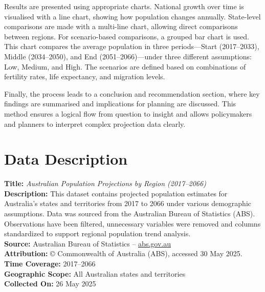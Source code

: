 \documentclass[
  11pt,
]{article}
\begin{document}
Results are presented using appropriate charts. National growth over
time is visualised with a line chart, showing how population changes
annually. State-level comparisons are made with a multi-line chart,
allowing direct comparisons between regions. For scenario-based
comparisons, a grouped bar chart is used. This chart compares the
average population in three periods---Start (2017--2033), Middle
(2034--2050), and End (2051--2066)---under three different assumptions:
Low, Medium, and High. The scenarios are defined based on combinations
of fertility rates, life expectancy, and migration levels.

Finally, the process leads to a conclusion and recommendation section,
where key findings are summarised and implications for planning are
discussed. This method ensures a logical flow from question to insight
and allows policymakers and planners to interpret complex projection
data clearly.

\section{Data Description}\label{data-description}

\begin{tcolorbox}[enhanced jigsaw, rightrule=.15mm, colbacktitle=quarto-callout-note-color!10!white, coltitle=black, opacitybacktitle=0.6, titlerule=0mm, bottomrule=.15mm, arc=.35mm, colback=white, left=2mm, toprule=.15mm, toptitle=1mm, opacityback=0, bottomtitle=1mm, colframe=quarto-callout-note-color-frame, title=\textcolor{quarto-callout-note-color}{\faInfo}\hspace{0.5em}{Meta Data}, leftrule=.75mm, breakable]

\textbf{Title:} \emph{Australian Population Projections by Region
(2017--2066)}\\
\textbf{Description:} This dataset contains projected population
estimates for Australia's states and territories from 2017 to 2066 under
various demographic assumptions. Data was sourced from the Australian
Bureau of Statistics (ABS). Observations have been filtered, unnecessary
variables were removed and columns standardized to support regional
population trend analysis.\\
\textbf{Source:} Australian Bureau of Statistics --
\href{https://www.abs.gov.au}{abs.gov.au}\\
\textbf{Attribution:} © Commonwealth of Australia (ABS), accessed 30 May
2025.\\
\textbf{Time Coverage:} 2017--2066\\
\textbf{Geographic Scope:} All Australian states and territories\\
\textbf{Collected On:} 26 May 2025

\end{tcolorbox}
\end{document}
